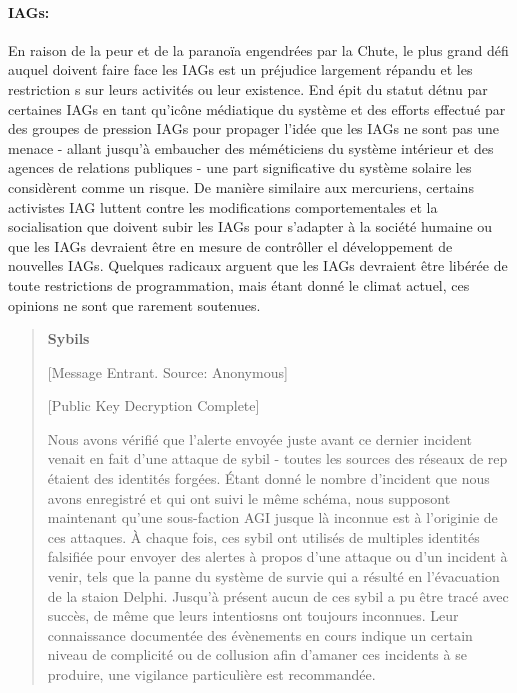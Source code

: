                                           \paragraph{IAGs:} En raison de la peur et de la paranoïa engendrées par la Chute, le plus grand défi auquel doivent faire face les IAGs est un préjudice largement répandu et les restriction s sur leurs activités ou leur existence. End épit du statut détnu par certaines IAGs en tant qu'icône médiatique du système et des efforts effectué par des groupes de pression IAGs pour propager l'idée que les IAGs ne sont pas une menace - allant jusqu'à embaucher des méméticiens du système intérieur et des agences de relations publiques - une part significative du système solaire les considèrent comme un risque. De manière similaire aux mercuriens, certains activistes IAG luttent contre les modifications comportementales et la socialisation que doivent subir les IAGs pour s'adapter à la société humaine ou que les IAGs devraient être en mesure de contrôller el développement de nouvelles IAGs. Quelques radicaux arguent que les IAGs devraient être libérée de toute restrictions de programmation, mais étant donné le climat actuel, ces opinions ne sont que rarement soutenues. 

                                          \begin{quotation} \textbf{Sybils} 

                                             [Message Entrant. Source: Anonymous] 

                                             [Public Key Decryption Complete] 

                                             Nous avons vérifié que l'alerte envoyée juste avant ce dernier incident venait en fait d'une attaque de sybil - toutes les sources des réseaux de rep étaient des identités forgées. Étant donné le nombre d'incident que nous avons enregistré et qui ont suivi le même schéma, nous supposont maintenant qu'une sous-faction AGI jusque là inconnue est à l'originie de ces attaques. À chaque fois, ces sybil ont utilisés de multiples identités falsifiée pour envoyer des alertes à propos d'une attaque ou d'un incident à venir, tels que la panne du système de survie qui a résulté en l'évacuation de la staion Delphi. Jusqu'à présent aucun de ces sybil a pu être tracé avec succès, de même que leurs intentiosns ont toujours inconnues. Leur connaissance documentée des évènements en cours indique un certain niveau de complicité ou de collusion afin d'amaner ces incidents à se produire, une vigilance particulière est recommandée. \end{quotation} 

